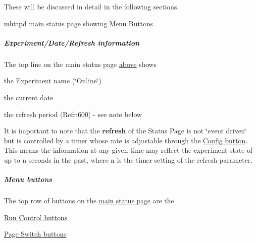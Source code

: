 These will be discussed in detail in the following sections. \par
 \label{RC_mhttpd_status_page_features_RC_mhttpd_main_status_new}
\hypertarget{RC_mhttpd_status_page_features_RC_mhttpd_main_status_new}{}
 \begin{center} mhttpd main status page showing Menu Buttons \par
\par
\par
  \end{center}  \par
\hypertarget{RC_mhttpd_status_page_features_RC_mhttpd_status_title}{}\subparagraph{Experiment/Date/Refresh information}\label{RC_mhttpd_status_page_features_RC_mhttpd_status_title}
The top line on the main status page \hyperlink{RC_mhttpd_status_page_features_RC_mhttpd_main_status_new}{above} shows
\begin{DoxyItemize}
\item the Experiment name (\char`\"{}Online\char`\"{})
\item the current date
\item the refresh period (Refr:600) -\/ see note below
\end{DoxyItemize}

It is important to note that the {\bfseries refresh} of the Status Page is not \char`\"{}event driven\char`\"{} but is controlled by a timer whose rate is adjustable through the \hyperlink{RC_mhttpd_status_page_features_RC_mhttpd_Config_button}{Config button}. This means the information at any given time may reflect the experiment state of up to n seconds in the past, where n is the timer setting of the refresh parameter.





\label{RC_mhttpd_status_page_features_idx_mhttpd_buttons_menu}
\hypertarget{RC_mhttpd_status_page_features_idx_mhttpd_buttons_menu}{}
 \hypertarget{RC_mhttpd_status_page_features_RC_mhttpd_status_menu_buttons}{}\subparagraph{Menu buttons}\label{RC_mhttpd_status_page_features_RC_mhttpd_status_menu_buttons}
The top row of buttons on the \hyperlink{RC_mhttpd_status_page_features_RC_mhttpd_main_status_new}{main status page} are the
\begin{DoxyItemize}
\item \hyperlink{RC_mhttpd_status_page_features_RC_mhttpd_status_RC_buttons}{Run Control buttons}
\item \hyperlink{RC_mhttpd_status_page_features_RC_mhttpd_status_Page_buttons}{Page Switch buttons}
\end{DoxyItemize}

